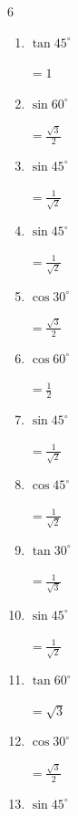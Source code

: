 \begin{multicols}{6}
\begin{enumerate}
        $\displaystyle =\frac{1}{\sqrt{3}}$

  \item $\displaystyle \tan{45^\circ}$

        $\displaystyle =1$

  \item $\displaystyle \sin{60^\circ}$

        $\displaystyle =\frac{\sqrt{3}}{2}$

  \item $\displaystyle \sin{45^\circ}$

        $\displaystyle =\frac{1}{\sqrt{2}}$

  \item $\displaystyle \sin{45^\circ}$

        $\displaystyle =\frac{1}{\sqrt{2}}$

  \item $\displaystyle \cos{30^\circ}$

        $\displaystyle =\frac{\sqrt{3}}{2}$

  \item $\displaystyle \cos{60^\circ}$

        $\displaystyle =\frac{1}{2}$

  \item $\displaystyle \sin{45^\circ}$

        $\displaystyle =\frac{1}{\sqrt{2}}$

  \item $\displaystyle \cos{45^\circ}$

        $\displaystyle =\frac{1}{\sqrt{2}}$

  \item $\displaystyle \tan{30^\circ}$

        $\displaystyle =\frac{1}{\sqrt{3}}$

  \item $\displaystyle \sin{45^\circ}$

        $\displaystyle =\frac{1}{\sqrt{2}}$

\columnbreak %

  \item $\displaystyle \tan{60^\circ}$

        $\displaystyle =\sqrt{3}$

  \item $\displaystyle \cos{30^\circ}$

        $\displaystyle =\frac{\sqrt{3}}{2}$

  \item $\displaystyle \sin{45^\circ}$


\end{enumerate}
\end{multicols}
